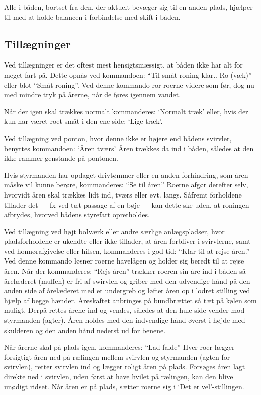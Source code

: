 \documentclass{article}
\begin{document}
Alle i båden, bortset fra den, der aktuelt bevæger sig til en anden
plads, hjælper til med at holde balancen i forbindelse med skift i båden.

\subsection{Tillægninger}

Ved tillægninger er det oftest mest hensigtsmæssigt, at båden ikke har
alt for meget fart på. Dette opnås ved kommandoen: ``Til småt roning
klar.. Ro (væk)'' eller blot ``Småt roning''. Ved denne kommando ror
roerne videre som før, dog nu med mindre tryk på årerne, når de føres
igennem vandet.

Når der igen skal trækkes normalt kommanderes: `Normalt træk' eller, hvis
der kun har været roet småt i den ene side: `Lige træk'.

Ved tillægning ved ponton, hvor denne ikke er højere end bådens svirvler,
benyttes kommandoen: `Åren tværs' Åren trækkes da ind i båden, således at
den ikke rammer genstande på pontonen.

Hvis styrmanden har opdaget drivtømmer eller en anden forhindring, som
åren måske vil kunne berøre, kommanderes: ``Se til åren'' Roerne afgør
derefter selv, hvorvidt åren skal trækkes lidt ind, tværs eller evt.
langs. Såfremt forholdene tillader det --- fx ved tæt passage af en bøje
--- kan dette ske uden, at roningen afbrydes, hvorved bådens styrefart
opretholdes.

Ved tillægning ved højt bolværk eller andre særlige anlægspladser, hvor
pladsforholdene er ukendte eller ikke tillader, at åren forbliver i
svirvlerne, samt ved honnørafgivelse eller hilsen, kommanderes i god tid:
``Klar til at rejse åren.'' Ved denne kommando løsner roerne havelågen og
holder sig beredt til at rejse åren. Når der kommanderes: ``Rejs åren''
trækker roeren sin åre ind i båden så årelæderet (muffen) er fri af
swirvlen og griber med den udvendige hånd på den anden side af årelæderet
med et undergreb og løfter åren op i lodret stilling ved hjælp af begge
hænder. Åreskaftet anbringes på bundbrættet så tæt på kølen som muligt.
Derpå rettes årene ind og vendes, således at den hule side vender mod
styrmanden (agter). Åren holdes med den indvendige hånd øverst i højde
med skulderen og den anden hånd nederst ud for benene.

Når årerne skal på plads igen, kommanderes: ``Lad falde'' Hver roer
lægger forsigtigt åren ned på rælingen mellem svirvlen og styrmanden
(agten for svirvlen), retter svirvlen ind og lægger roligt åren på plads.
Forsøges åren lagt direkte ned i svirvlen, uden først at have hvilet på
rælingen, kan den blive unødigt ridset. Når åren er på plads, sætter
roerne sig i `Det er vel'-stillingen.
\end{document}
